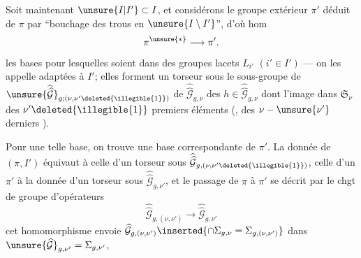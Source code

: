 
Soit maintenant $\unsure{I|I'}\subset I$,  et considérons le groupe extérieur $\pi'$ déduit de $\pi$ par ``bouchage des trous en $\unsure{I\setminus I'}$'', d'où hom
\[
\pi^{\unsure{*}}\longrightarrow\pi'.
\]
  les bases  pour lesquelles    soient dans des  groupes  lacets  $L_{i'}$ $(i'\in I')$ --- on les appelle adaptées à $I'$; elles forment un torseur  sous le sous-groupe de  $\unsure{\widehat{\widehat{\mathcal G}}}_{g;(\nu,\nu'\deleted{\illegible{1}})}$ de $\widehat{\widehat{\mathcal G}}_{g,\nu}$   des $h\in\widehat{\widehat{\mathcal G}}_{g,\nu}$ dont l'image dans $\mathfrak S_\nu$   des $\nu'\deleted{\illegible{1}}$ premiers éléments (, des $\nu-\unsure{\nu'}$ derniers ).


Pour une telle base, on trouve une base correspondante de $\pi'$.  La donnée de $(\pi,I')$ équivaut à celle d'un torseur sous $\widehat{\widehat{\mathcal G}}_{g,(\nu,\nu'\deleted{\illegible{1}})}$, celle d'un $\pi'$ à  la donnée d'un torseur sous $\widehat{\widehat{\mathcal G}}_{g,\nu'}$, et le passage de $\pi$ à $\pi'$ se décrit par le chgt de groupe d'opérateurs
\[
\widehat{\widehat{\mathcal G}}_{g,(\nu,\nu')}\longrightarrow\widehat{\widehat{\mathcal G}}_{g,\nu'}
\]
cet homomorphisme envoie $\widehat{\mathcal G}_{g,(\nu,\nu')}\inserted{\cap\Sigma_{g,\nu}=\Sigma_{g,(\nu,\nu')}}$ dans $\unsure{\widehat{\mathcal G}}_{g,\nu'}=\Sigma_{g,\nu'}$,

